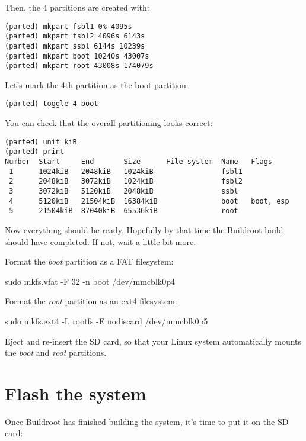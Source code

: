 Then, the 4 partitions are created with:
\begin{verbatim}
(parted) mkpart fsbl1 0% 4095s
(parted) mkpart fsbl2 4096s 6143s
(parted) mkpart ssbl 6144s 10239s
(parted) mkpart boot 10240s 43007s
(parted) mkpart root 43008s 174079s
\end{verbatim}

Let's mark the 4th partition as the boot partition:

\begin{verbatim}
(parted) toggle 4 boot
\end{verbatim}

You can check that the overall partitioning looks correct:

\begin{verbatim}
(parted) unit kiB
(parted) print
Number  Start     End       Size      File system  Name   Flags
 1      1024kiB   2048kiB   1024kiB                fsbl1
 2      2048kiB   3072kiB   1024kiB                fsbl2
 3      3072kiB   5120kiB   2048kiB                ssbl
 4      5120kiB   21504kiB  16384kiB               boot   boot, esp
 5      21504kiB  87040kiB  65536kiB               root
\end{verbatim}

Now everything should be ready. Hopefully by that time the Buildroot
build should have completed. If not, wait a little bit more.

Format the {\em boot} partition as a FAT filesystem:

\begin{bashinput}
sudo mkfs.vfat -F 32 -n boot /dev/mmcblk0p4
\end{bashinput}

Format the {\em root} partition as an ext4 filesystem:

\begin{bashinput}
sudo mkfs.ext4 -L rootfs -E nodiscard /dev/mmcblk0p5
\end{bashinput}

Eject and re-insert the SD card, so that your Linux system
automatically mounts the {\em boot} and {\em root} partitions.

\section{Flash the system}

Once Buildroot has finished building the system, it's time to put it
on the SD card:

